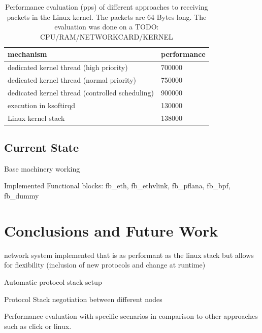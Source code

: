 \documentclass{sig-alternate}
\begin{document}
\begin{table}[htb]
\begin{tabular}{ l l }
mechanism & performance\\
\hline
dedicated kernel thread (high priority) & 700000\\
dedicated kernel thread (normal priority) & 750000\\
dedicated kernel thread (controlled scheduling) & 900000\\
execution in ksoftirqd & 130000\\
Linux kernel stack & 138000\\
\end{tabular}
\caption{Performance evaluation (pps) of different approaches to receiving packets in the Linux kernel. The packets are 64 Bytes long. The evaluation was done on a TODO: CPU/RAM/NETWORKCARD/KERNEL}
\label{tab:performance}
\end{table}	


\subsection{Current State}
\begin{compactitem}
\item Base machinery working
\item Implemented Functional blocks: fb\_eth, fb\_ethvlink, fb\_pflana, fb\_bpf, fb\_dummy
\end{compactitem}



\section{Conclusions and Future Work}
\begin{compactitem}
\item network system implemented that is as performant as the linux stack but allows for flexibility (inclusion of new protocols and change at runtime)
\item Automatic protocol stack setup
\item Protocol Stack negotiation between different nodes
\item Performance evaluation with specific scenarios in comparison to other approaches such as click or linux.
\end{compactitem}
\end{document}
